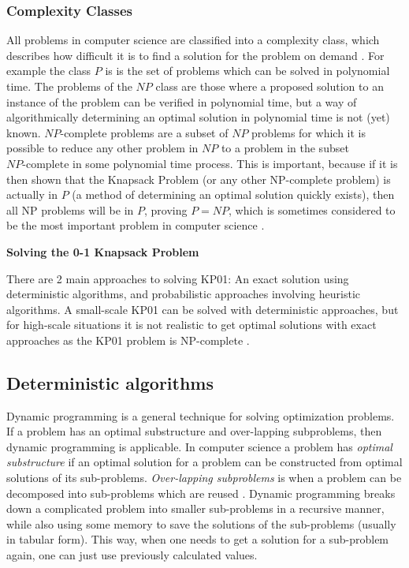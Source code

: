 \documentclass[titlepage]{article}
\begin{document}
\subsubsection*{Complexity Classes}
All problems in computer science are classified into a complexity class, which describes how difficult it is to find a solution for the problem on demand \cite{complexity-class}. For example the class $P$ is is the set of problems which can be solved in polynomial time. The problems of the $NP$ class are those where a proposed solution to an instance of the problem can be verified in polynomial time, but a way of algorithmically determining an optimal solution in polynomial time is not (yet) known. $NP\text{-complete}$ problems are a subset of $NP$ problems for which it is possible to reduce any other problem in $NP$ to a problem in the subset $NP\text{-complete}$ in some polynomial time process. This is important, because if it is then shown that the Knapsack Problem (or any other NP-complete problem) is actually in $P$ (a method of determining an optimal solution quickly exists), then all NP problems will be in $P$, proving $P=NP$, which is sometimes considered to be the most important problem in computer science \cite{PvsNP}. 

\vskip 1cm

\textbf{Solving the 0-1 Knapsack Problem} \mbox{}\

There are 2 main approaches to solving KP01: An exact solution using deterministic algorithms, and probabilistic approaches involving heuristic algorithms. A small-scale KP01 can be solved with deterministic approaches, but for high-scale situations it is not realistic to get optimal solutions with exact approaches \cite{QWPA} as the KP01 problem is NP-complete \cite{KPNP}. 

\subsection*{Deterministic algorithms}
Dynamic programming is a general technique for solving optimization problems. If a problem has an optimal substructure and over-lapping subproblems, then dynamic programming is applicable. In computer science a problem has \emph{optimal substructure} if an optimal solution for a problem can be constructed from optimal solutions of its sub-problems. \emph{Over-lapping subproblems} is when a problem can be decomposed into sub-problems which are reused \cite{optimalSubstructure}. Dynamic programming breaks down a complicated problem into smaller sub-problems in a recursive manner, while also using some memory to save the solutions of the sub-problems (usually in tabular form). This way, when one needs to get a solution for a sub-problem again, one can just use previously calculated values. 
\end{document}
